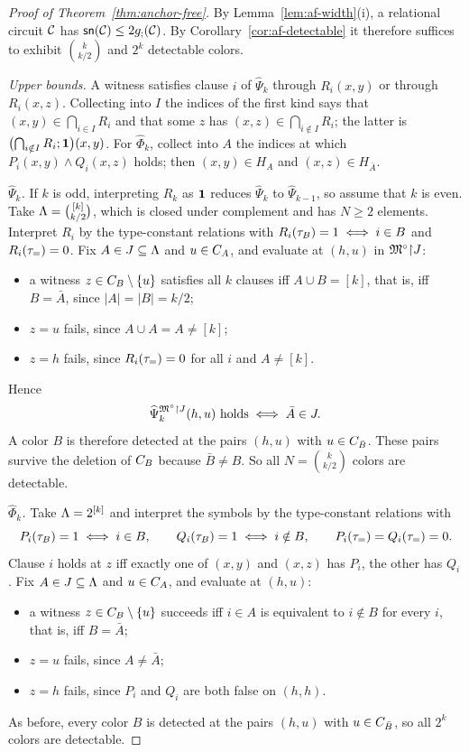 \begin{proof}[Proof of Theorem~\ref{thm:anchor-free}]
By Lemma~\ref{lem:af-width}(i), a relational circuit $\mathcal C$ has
$\mathsf{sn}(\mathcal C)\le2g_{;}(\mathcal C)$. By Corollary~\ref{cor:af-detectable} it
therefore suffices to exhibit $\binom{k}{k/2}$ and $2^k$ detectable colors.

\emph{Upper bounds.} A witness satisfies clause $i$ of $\widehat\Psi_k$
through $R_i(x,y)$ or through $R_i(x,z)$. Collecting into $I$ the indices
of the first kind says that $(x,y)\in\bigcap_{i\in I}R_i$ and that some $z$
has $(x,z)\in\bigcap_{i\notin I}R_i$; the latter is
$\bigl(\bigcap_{i\notin I}R_i;\mathbf{1}\bigr)(x,y)$. For $\widehat\Phi_k$,
collect into $A$ the indices at which $P_i(x,y)\land Q_i(x,z)$ holds; then
$(x,y)\in H_A$ and $(x,z)\in H_{\bar A}$.

\emph{$\widehat\Psi_k$.} If $k$ is odd, interpreting $R_k$ as $\mathbf{1}$
reduces $\widehat\Psi_k$ to $\widehat\Psi_{k-1}$, so assume that $k$ is
even. Take $\Lambda=\binom{[k]}{k/2}$, which is closed under complement and
has $N\ge2$ elements. Interpret $R_i$ by the type-constant relations with
$R_i(\tau_{B})=1\iff i\in B$ and $R_i(\tau_{=})=0$. Fix
$A\in J\subseteq\Lambda$ and $u\in C_{A}$, and evaluate at $(h,u)$ in
$\mathfrak M^\circ\mathord{\restriction} J$:
\begin{itemize}[nosep]
\item a witness $z\in C_{B}\setminus\{u\}$ satisfies all $k$ clauses iff
 $A\cup B=[k]$, that is, iff $B=\bar A$, since $|A|=|B|=k/2$;
\item $z=u$ fails, since $A\cup A=A\ne[k]$;
\item $z=h$ fails, since $R_i(\tau_{=})=0$ for all $i$ and $A\ne[k]$.
\end{itemize}
Hence
\[
 \widehat\Psi_k^{\mathfrak M^\circ\mathord{\restriction} J}(h,u)\ \text{holds}\iff\bar A\in J .
\]
A color $B$ is therefore detected at the pairs $(h,u)$ with
$u\in C_{\bar B}$. These pairs survive the deletion of $C_{B}$ because
$\bar B\ne B$. So all $N=\binom{k}{k/2}$ colors are detectable.

\emph{$\widehat\Phi_k$.} Take $\Lambda=2^{[k]}$ and interpret the symbols by
the type-constant relations with
\begin{equation}\label{eq:af-phi-inputs}
 P_i(\tau_{B})=1\iff i\in B,\qquad Q_i(\tau_{B})=1\iff i\notin B,\qquad
 P_i(\tau_{=})=Q_i(\tau_{=})=0 .
\end{equation}
Clause $i$ holds at $z$ iff exactly one of $(x,y)$ and $(x,z)$ has $P_i$,
the other has $Q_i$. Fix $A\in J\subseteq\Lambda$ and $u\in C_{A}$, and
evaluate at $(h,u)$:
\begin{itemize}[nosep]
\item a witness $z\in C_{B}\setminus\{u\}$ succeeds iff $i\in A$ is
 equivalent to $i\notin B$ for every $i$, that is, iff $B=\bar A$;
\item $z=u$ fails, since $A\ne\bar A$;
\item $z=h$ fails, since $P_i$ and $Q_i$ are both false on $(h,h)$.
\end{itemize}
As before, every color $B$ is detected at the pairs $(h,u)$ with
$u\in C_{\bar B}$, so all $2^k$ colors are detectable.


\end{proof}
